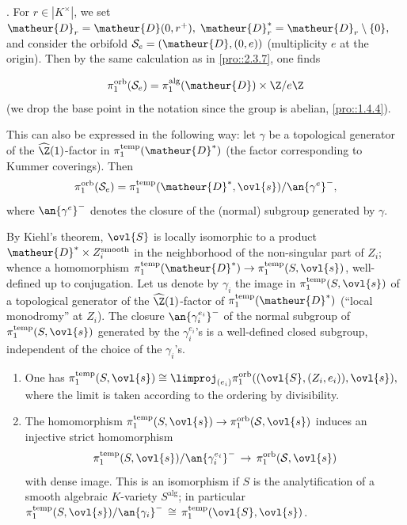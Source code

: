 \medskip{}. For $r\in | K^\times|$, we set $\matheur{D}_r=
\matheur{D}(0,r^+),\;\matheur{D}_r^\ast=\matheur{D}_r\setminus \{0\},$ and consider the orbifold
$\mathcal{S}_e = (\matheur{D},(0,e))$ (multiplicity $e$ at the origin). Then by
the same calculation as in \ref{pro::2.3.7}, one finds

\begin{equation*}
\pi_1^{\mathrm{orb}}(\mathcal{S}_e)=\pi_1^{\mathrm{alg}}(\matheur{D})\times \Z/e\Z 
\end{equation*} 
(we drop the base point in the notation since the group is abelian, \cf
\ref{pro::1.4.4}).

This can also be expressed in the following way: let $\gamma$ be a
topological generator of the $\widehat{\Z}(1)$-factor in
$\pi_1^{\mathrm{temp}}(\matheur{D}^\ast)$ (the factor corresponding to Kummer
coverings). Then \begin{equation*} \pi_1^{\mathrm{orb}}(\mathcal{S}_e
)=\pi_1^{\mathrm{temp}}(\matheur{D}^\ast,\ovl{s})/\an{\gamma^e}^- , \end{equation*}
where $\an{\gamma^e}^-$ denotes the closure of the (normal) subgroup
generated by $\gamma$.

 
\begin{para}\label{para::4.5.4} By Kiehl's theorem, $\ovl{S}$ is locally
 isomorphic to a product $\matheur{D}^\ast\times Z_i^{\mathrm{smooth}}$ in the
 neighborhood 
 of the non-singular part of $Z_i$; whence a homomorphism
 $\pi_1^{\mathrm{temp}}(\matheur{D}^\ast)\to \pi_1^{\mathrm{temp}}(S,\ovl{s})$,
 well-defined up to conjugation. Let us denote by $\gamma_i$ the image in
 $\pi_1^{\mathrm{temp}}(S,\ovl{s})$ of a topological generator of the
 $\widehat{\Z}(1)$-factor of $\pi_1^{\mathrm{temp}}(\matheur{D}^\ast)$ (``local
 monodromy'' at $Z_i$). The closure $\an{\gamma_i^{e_i}}^-$ of the normal
 subgroup of $\pi_1^{\mathrm{temp}}(S,\ovl{s})$ generated by the
 $\gamma_i^{e_i}$'s is a well-defined closed subgroup, independent of the
 choice of the $\gamma_i$'s.
\end{para}

\begin{thm}\label{thm::4.5.5}
 \begin{enumerate}
  \renewcommand{\theenumi}{\alph{enumi}}
  \item One has $\displaystyle
	\pi_1^{\mathrm{temp}}(S,\ovl{s}) \cong \limproj_{(e_i)}
	\pi_1^{\mathrm{orb}}((\ovl{S},(Z_i,e_i)),\ovl{s}),$ where the
	limit is taken according to the ordering by divisibility.
  \item The homomorphism $\pi_1^{\mathrm{temp}}(S,\ovl{s})\to
	\pi_1^{\mathrm{orb}}(\mathcal{S},\ovl{s})$ induces an injective strict
	homomorphism
	\begin{equation*}
	 \pi_1^{\mathrm{temp}}(S,\ovl{s})/\an{\gamma_i^{e_i}}^-\,\to \,
	  \pi_1^{\mathrm{orb}}(\mathcal{S},\ovl{s})
	\end{equation*}
	with dense image. This is an isomorphism if $S$ is the analytification
	of a smooth algebraic $K$-variety $S^{\mathrm{alg}}$; in particular
	$\pi_1^{\mathrm{temp}}(S,\ovl{s})/\an{\gamma_i }^-\,\cong \,
	\pi_1^{\mathrm{temp}}({\ovl{S}},\ovl{s}) $.
 \end{enumerate}
\end{thm}
 
